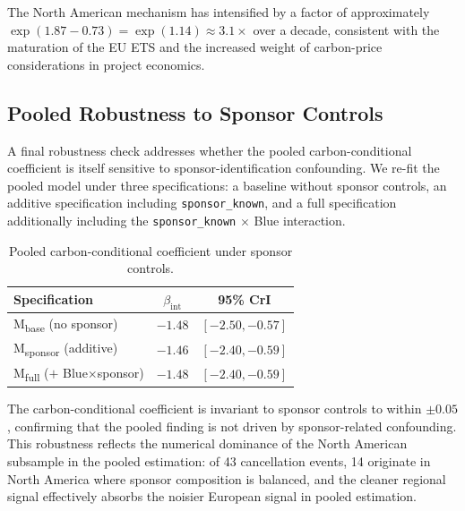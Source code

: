 \documentclass[11pt,a4paper]{article}
\newcommand{\bint}{\beta_{\mathrm{int}}}
\begin{document}
The North American mechanism has intensified by a factor of approximately $\exp(1.87 - 0.73) = \exp(1.14) \approx 3.1\times$ over a decade, consistent with the maturation of the EU ETS and the increased weight of carbon-price considerations in project economics.


\subsection{Pooled Robustness to Sponsor Controls}
\label{sec:ch7-pooled-sponsor}

A final robustness check addresses whether the pooled carbon-conditional coefficient is itself sensitive to sponsor-identification confounding. We re-fit the pooled model under three specifications: a baseline without sponsor controls, an additive specification including \texttt{sponsor\_known}, and a full specification additionally including the \texttt{sponsor\_known} $\times$ Blue interaction.

\begin{table}[h!]
\centering
\caption{Pooled carbon-conditional coefficient under sponsor controls.}
\begin{tabular}{lcc}
\toprule
Specification & $\bint$ & 95\% CrI \\
\midrule
M\textsubscript{base} (no sponsor) & $-1.48$ & $[-2.50, -0.57]$ \\
M\textsubscript{sponsor} (additive) & $-1.46$ & $[-2.40, -0.59]$ \\
M\textsubscript{full} ($+$ Blue$\times$sponsor) & $-1.48$ & $[-2.40, -0.59]$ \\
\bottomrule
\end{tabular}
\label{tab:ch7-pooled-sponsor}
\end{table}

The carbon-conditional coefficient is invariant to sponsor controls to within $\pm 0.05$, confirming that the pooled finding is not driven by sponsor-related confounding. This robustness reflects the numerical dominance of the North American subsample in the pooled estimation: of 43 cancellation events, 14 originate in North America where sponsor composition is balanced, and the cleaner regional signal effectively absorbs the noisier European signal in pooled estimation.
\end{document}
